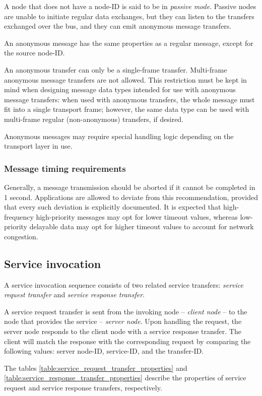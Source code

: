 A node that does not have a node-ID is said to be in \emph{passive mode}.
Passive nodes are unable to initiate regular data exchanges,
but they can listen to the transfers exchanged over the bus,
and they can emit anonymous message transfers.

An anonymous message has the same properties as a regular message, except for the source node-ID.

An anonymous transfer can only be a single-frame transfer. Multi-frame anonymous message transfers are not allowed.
This restriction must be kept in mind when designing message data types
intended for use with anonymous message transfers:
when used with anonymous transfers, the whole message must fit into a single transport frame;
however, the same data type can be used with multi-frame regular (non-anonymous) transfers, if desired.

Anonymous messages may require special handling logic depending on the transport layer in use.

\subsubsection{Message timing requirements}

Generally, a message transmission should be aborted if it cannot be completed in 1 second.
Applications are allowed to deviate from this recommendation,
provided that every such deviation is explicitly documented.
It is expected that high-frequency high-priority messages may opt for lower timeout values,
whereas low-priority delayable data may opt for higher timeout values to account for network congestion.

\subsection{Service invocation}

A service invocation sequence consists of two related service transfers:
\emph{service request transfer} and \emph{service response transfer}.

A service request transfer is sent from the invoking node -- \emph{client node} -- to the node
that provides the service -- \emph{server node}.
Upon handling the request, the server node responds to the client node with a service response transfer.
The client will match the response with the corresponding request by comparing the following values:
server node-ID, service-ID, and the transfer-ID.

The tables \ref{table:service_request_transfer_properties} and \ref{table:service_response_transfer_properties}
describe the properties of service request and service response transfers, respectively.

